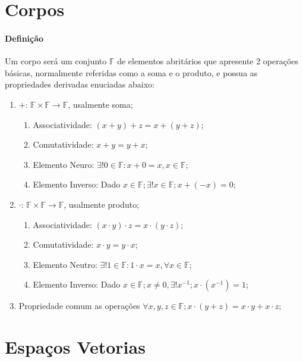 \documentclass{article}
\begin{document}
    \section{Corpos}
        \paragraph{Definição}Um corpo será um conjunto $\mathbb{F}$ de elementos abritários que apresente 2 operações básicas, normalmente referidas como a soma e o produto, e possua as propriedades derivadas enuciadas abaixo:
            \begin{enumerate}[noitemsep]
                \item $+$: $\mathbb{F}\times\mathbb{F}\rightarrow\mathbb{F}$, usalmente soma;
                    \begin{enumerate}[noitemsep]
                        \item Associatividade: $(x+y)+z = x+(y+z)$;
                        \item Comutatividade: $x+y=y+x$;
                        \item Elemento Neuro: $\exists! 0 \in \mathbb{F}: x+0=x, x\in\mathbb{F}$;
                        \item Elemento Inverso: Dado $x\in\mathbb{F};\exists!x\in\mathbb{F}; x+(-x)=0$;
                    \end{enumerate}
                \item $\cdot$: $\mathbb{F}\times\mathbb{F}\rightarrow\mathbb{F}$, usalmente produto;
                \begin{enumerate}[noitemsep]
                    \item Associatividade: $(x\cdot y)\cdot z = x\cdot(y\cdot z)$;
                    \item Comutatividade: $x\cdot y=y\cdot x$;
                    \item Elemento Neutro: $\exists! 1 \in \mathbb{F}: 1 \cdot x=x, \forall x\in\mathbb{F}$;
                    \item Elemento Inverso: Dado $x\in\mathbb{F}; x\neq 0,\exists!x^{-1}; x\cdot(x^{-1})=1$;
                \end{enumerate}
                \item Propriedade comum as operações $\forall x,y,z \in \mathbb{F}; x\cdot(y+z)=x\cdot y+ x\cdot z$;
            \end{enumerate}
\newpage

    \section{Espaços Vetorias}
\end{document}
